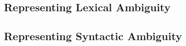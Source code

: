 
\subsection{Representing Lexical Ambiguity}

\subsection{Representing Syntactic Ambiguity}

%
%

% 